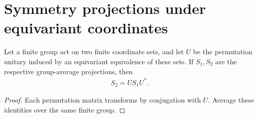 \section{Symmetry projections under equivariant coordinates}
\label{sec:symmetric_projection_coordinates}

\begin{theorem}
\label{thm:symmetric_projection_equivariant_coordinates}
\leanok
Let a finite group act on two finite coordinate sets, and let $U$ be
the permutation unitary induced by an equivariant equivalence of these
sets. If $S_1,S_2$ are the respective group-average projections, then
\begin{align}
 S_2=US_1U^*.
\end{align}
\end{theorem}
\begin{proof}
\leanok
Each permutation matrix transforms by conjugation with $U$.
Average these identities over the same finite group.
\end{proof}

